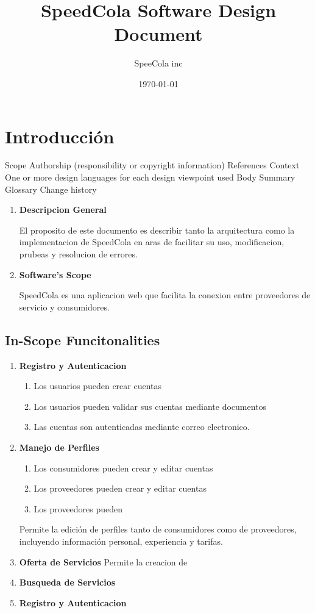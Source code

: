 \documentclass{article}
\title{SpeedCola Software Design Document}
\date{\today}%
\author{SpeeCola inc}%
\begin{document}
\maketitle
\newpage
{}

\section{Introducci\'on}
Scope
   Authorship (responsibility or copyright information)
   References
   Context
   One or more design languages for each design viewpoint used
   Body
   Summary
   Glossary
   Change history

  \begin{enumerate}
    \item  \textbf{Descripcion General}

  El proposito de este documento es describir tanto la arquitectura como la implementacion de 
  SpeedCola en aras de facilitar su uso, modificacion, prubeas y resolucion de errores.

  \item \textbf{Software's Scope}

  SpeedCola es una aplicacion web que facilita la conexion entre proveedores de servicio y consumidores.

  \end{enumerate}

  \subsection{In-Scope Funcitonalities}
    \begin{enumerate}
      \item \textbf{Registro y Autenticacion}
        \begin{enumerate}
          \item Los usuarios pueden crear cuentas
          \item Los usuarios pueden validar sus cuentas mediante documentos
          \item Las cuentas son autenticadas mediante correo electronico.
        \end{enumerate}
      \item \textbf{Manejo de Perfiles}
        \begin{enumerate}
          \item Los consumidores pueden crear y editar cuentas
          \item Los proveedores pueden crear  y editar cuentas
          \item Los proveedores pueden 
        \end{enumerate}
      Permite la edición de perfiles tanto de consumidores como de 
      proveedores, incluyendo información personal, experiencia y tarifas.  
      \item \textbf{Oferta de Servicios}
        Permite la creacion de 
      \item \textbf{Busqueda de Servicios}
      \item \textbf{Registro y Autenticacion}
    \end{enumerate}
\end{document}
